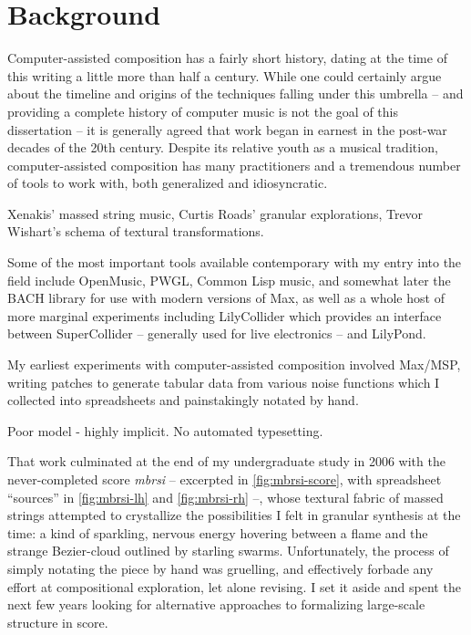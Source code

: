 \section{Background}
\label{sec:background}

Computer-assisted composition has a fairly short history, dating at the time of
this writing a little more than half a century. While one could certainly argue
about the timeline and origins of the techniques falling under this umbrella --
and providing a complete history of computer music is not the goal of this
dissertation -- it is generally agreed that work began in earnest in the
post-war decades of the 20th century.\cite{curtis1996computer,
xenakis1992formalized} Despite its relative youth as a musical tradition,
computer-assisted composition has many practitioners and a tremendous number
of tools to work with, both generalized and idiosyncratic.

Xenakis' massed string music, Curtis Roads' granular explorations, Trevor
Wishart's schema of textural transformations.

Some of the most important tools available contemporary with my entry into the
field include OpenMusic, PWGL, Common Lisp music, and somewhat later the BACH
library for use with modern versions of Max, as well as a whole host of more
marginal experiments including LilyCollider which provides an interface between
SuperCollider -- generally used for live electronics -- and LilyPond.

My earliest experiments with computer-assisted composition involved Max/MSP,
writing patches to generate tabular data from various noise functions which I
collected into spreadsheets and painstakingly notated by hand.

Poor model - highly implicit. No automated typesetting.

That work culminated at the end of my undergraduate study in 2006 with the
never-completed score \emph{mbrsi} -- excerpted in \autoref{fig:mbrsi-score},
with spreadsheet \enquote{sources} in \autoref{fig:mbrsi-lh} and
\autoref{fig:mbrsi-rh} --, whose textural fabric of massed strings attempted to
crystallize the possibilities I felt in granular synthesis at the time: a kind
of sparkling, nervous energy hovering between a flame and the strange
Bezier-cloud outlined by starling swarms. Unfortunately, the process of simply
notating the piece by hand was gruelling, and effectively forbade any effort at
compositional exploration, let alone revising. I set it aside and spent the
next few years looking for alternative approaches to formalizing large-scale
structure in score.

